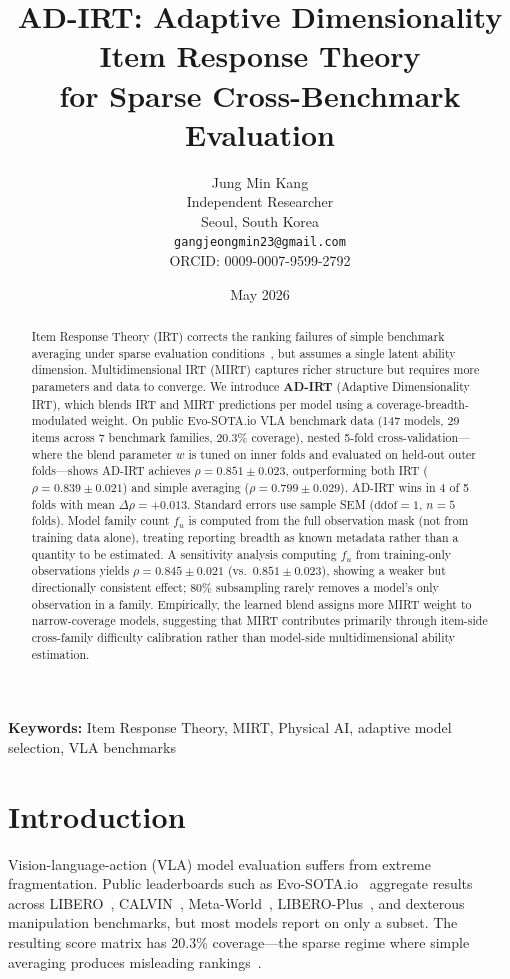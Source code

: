 \documentclass[11pt]{article}
\title{AD-IRT: Adaptive Dimensionality Item Response Theory\\for Sparse Cross-Benchmark Evaluation}
\author{Jung Min Kang\\Independent Researcher\\Seoul, South Korea\\{\tt gangjeongmin23@gmail.com}\\ORCID: 0009-0007-9599-2792}
\date{May 2026}
\begin{document}
\maketitle

\begin{abstract}
Item Response Theory (IRT) corrects the ranking failures of simple benchmark averaging under sparse evaluation conditions~\citep{kang2026efsl}, but assumes a single latent ability dimension. Multidimensional IRT (MIRT) captures richer structure but requires more parameters and data to converge. We introduce \textbf{AD-IRT} (Adaptive Dimensionality IRT), which blends IRT and MIRT predictions per model using a coverage-breadth-modulated weight. On public Evo-SOTA.io VLA benchmark data (147 models, 29 items across 7 benchmark families, 20.3\% coverage), nested 5-fold cross-validation---where the blend parameter $w$ is tuned on inner folds and evaluated on held-out outer folds---shows AD-IRT achieves $\rho = 0.851 \pm 0.023$, outperforming both IRT ($\rho = 0.839 \pm 0.021$) and simple averaging ($\rho = 0.799 \pm 0.029$). AD-IRT wins in 4 of 5 folds with mean $\Delta\rho = +0.013$. Standard errors use sample SEM ($\mathrm{ddof}=1$, $n=5$ folds). Model family count $f_u$ is computed from the full observation mask (not from training data alone), treating reporting breadth as known metadata rather than a quantity to be estimated. A sensitivity analysis computing $f_u$ from training-only observations yields $\rho = 0.845 \pm 0.021$ (vs.\ $0.851 \pm 0.023$), showing a weaker but directionally consistent effect; 80\% subsampling rarely removes a model's only observation in a family. Empirically, the learned blend assigns more MIRT weight to narrow-coverage models, suggesting that MIRT contributes primarily through item-side cross-family difficulty calibration rather than model-side multidimensional ability estimation.
\end{abstract}

\noindent\textbf{Keywords:} Item Response Theory, MIRT, Physical AI, adaptive model selection, VLA benchmarks

\section{Introduction}

Vision-language-action (VLA) model evaluation suffers from extreme fragmentation. Public leaderboards such as Evo-SOTA.io~\citep{evosota2026} aggregate results across LIBERO~\citep{liu2023libero}, CALVIN~\citep{mees2022calvin}, Meta-World~\citep{yu2020metaworld}, LIBERO-Plus~\citep{fei2025liberoplus}, and dexterous manipulation benchmarks, but most models report on only a subset. The resulting score matrix has 20.3\% coverage---the sparse regime where simple averaging produces misleading rankings~\citep{kang2026efsl}.
\end{document}
